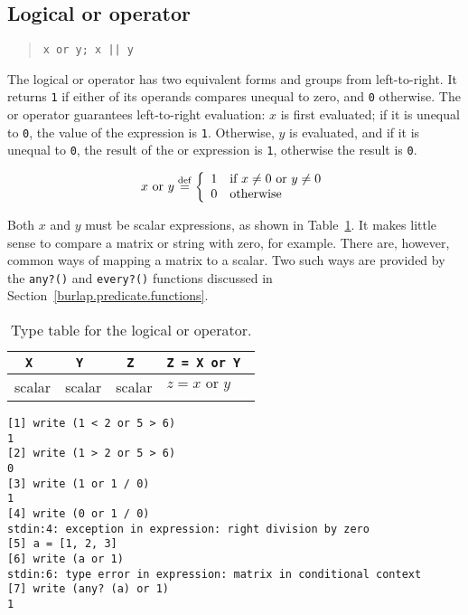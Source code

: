 \subsection{Logical {\sc or} operator}
\label{burlap.op.or}

\begin{quote}
\begin{verbatim}
x or y; x || y
\end{verbatim}
\end{quote}

The logical {\sc or} operator has two equivalent forms and groups from
left-to-right.  It returns {\tt 1} if either of its operands compares
unequal to zero, and {\tt 0} otherwise.  The {\sc or} operator
guarantees left-to-right evaluation: $x$ is first evaluated; if it is
unequal to {\tt 0}, the value of the expression is {\tt 1}.
Otherwise, $y$ is evaluated, and if it is unequal to {\tt 0}, the
result of the {\sc or} expression is {\tt 1}, otherwise the result is
{\tt 0}.

\begin{displaymath}
x \mbox{ or } y \stackrel{\rm def}{=} \left\{
\begin{array}{ll}
1 & \mbox{if $x \neq 0$ or $y \neq 0$} \\
0 & \mbox{otherwise}
\end{array} \right.
\end{displaymath}

Both $x$ and $y$ must be scalar expressions, as shown in
Table~\ref{burlap.or.types}.  It makes little sense to compare a
matrix or string with zero, for example.  There are, however, common
ways of mapping a matrix to a scalar.  Two such ways are provided by
the {\tt any?()} and {\tt every?()} functions discussed in
Section~\ref{burlap.predicate.functions}.

\begin{table}[htbp]
\begin{center}
\begin{tabular}{c|c|c|l}
\tt X  & \tt Y	& \tt Z	 & \tt Z = X or Y \\
\hline
scalar & scalar & scalar & $z = x \mbox{ or } y$ \\
\end{tabular}
\caption{Type table for the logical {\sc or} operator.}
\label{burlap.or.types}
\end{center}
\end{table}

\begin{screen}
\begin{verbatim}
[1] write (1 < 2 or 5 > 6)
1
[2] write (1 > 2 or 5 > 6)
0
[3] write (1 or 1 / 0)
1
[4] write (0 or 1 / 0)
stdin:4: exception in expression: right division by zero
[5] a = [1, 2, 3]
[6] write (a or 1)
stdin:6: type error in expression: matrix in conditional context
[7] write (any? (a) or 1)
1
\end{verbatim}
\end{screen}


